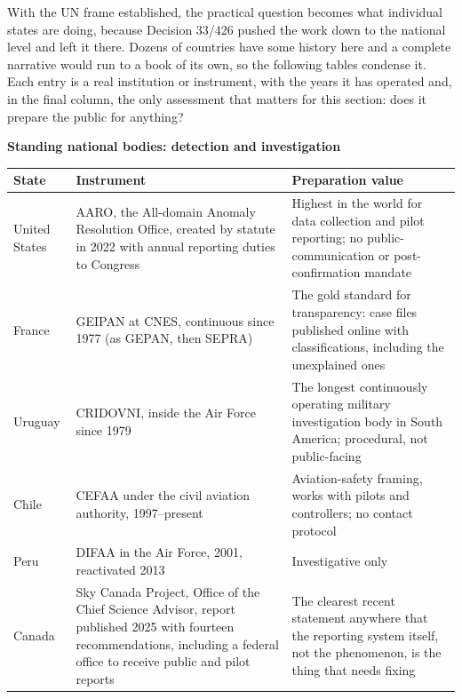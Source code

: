 With the UN frame established, the practical question becomes what individual states are doing,
because Decision 33/426 pushed the work down to the national level and left it there. Dozens of
countries have some history here and a complete narrative would run to a book of its own, so the
following tables condense it. Each entry is a real institution or instrument, with the years it has
operated and, in the final column, the only assessment that matters for this section: does it
prepare the public for anything?

\begin{center}\small
\textbf{\textcolor{ufogreenink}{Standing national bodies: detection and investigation}}\par\vspace{4pt}
\begin{tabular}{@{}p{}p{}p{}@{}}
\toprule
\textbf{State} & \textbf{Instrument} & \textbf{Preparation value}\\
\midrule
United States & AARO, the All-domain Anomaly Resolution Office, created by statute in 2022 with
annual reporting duties to Congress & Highest in the world for data collection and pilot reporting;
no public-communication or post-confirmation mandate\\[3pt]
France & GEIPAN at CNES, continuous since 1977 (as GEPAN, then SEPRA) & The gold standard for
transparency: case files published online with classifications, including the unexplained ones\\[3pt]
Uruguay & CRIDOVNI, inside the Air Force since 1979 & The longest continuously operating military
investigation body in South America; procedural, not public-facing\\[3pt]
Chile & CEFAA under the civil aviation authority, 1997--present & Aviation-safety framing, works
with pilots and controllers; no contact protocol\\[3pt]
Peru & DIFAA in the Air Force, 2001, reactivated 2013 & Investigative only\\[3pt]
Canada & Sky Canada Project, Office of the Chief Science Advisor, report published 2025 with
fourteen recommendations, including a federal office to receive public and pilot reports & The
clearest recent statement anywhere that the reporting system itself, not the phenomenon, is the
thing that needs fixing\\
\bottomrule
\end{tabular}
\end{center}

